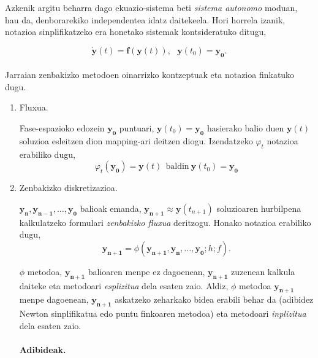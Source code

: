 Azkenik argitu beharra dago ekuazio-sistema beti \emph{sistema autonomo} moduan, hau da, denborarekiko independentea idatz daitekeela. Hori horrela izanik, notazioa sinplifikatzeko era honetako sistemak kontsideratuko ditugu,   

\begin{equation}
\dot{\mathbf{y}}(t)=\mathbf{f}(\mathbf{y}(t)),\ \ \ \mathbf{y}(t_0)=\mathbf{y_0}.
\end{equation}


\paragraph*{}Jarraian zenbakizko metodoen oinarrizko kontzeptuak eta notazioa finkatuko dugu.

\begin{enumerate}

\item Fluxua.

Fase-espazioko edozein $\mathbf{y_0}$ puntuari, $\mathbf{y}(t_0)=\mathbf{y_0}$ hasierako balio duen $\mathbf{y}(t)$ soluzioa esleitzen dion mapping-ari deitzen diogu. Izendatzeko $\varphi_t$ notazioa erabiliko dugu,
\begin{equation*}
\varphi_t(\mathbf{y_0})=\mathbf{y}(t) \ \ \text{baldin} \  \mathbf{y}(t_0)=\mathbf{y_0}
\end{equation*}

\item Zenbakizko diskretizazioa.

$\mathbf{y_{n}},\mathbf{y_{n-1}},\dots ,\mathbf{y_0}$ balioak emanda, $\mathbf{y_{n+1}}\approx \mathbf{y}(t_{n+1})$ soluzioaren hurbilpena kalkulatzeko formulari \emph{zenbakizko fluxua} deritzogu. Honako notazioa erabiliko dugu,
\begin{equation*}
\mathbf{y_{n+1}}=\phi(\mathbf{y_{n+1}},\mathbf{y_{n}},\dots,\mathbf{y_0};h;f).
\end{equation*}

$\phi$ metodoa, $\mathbf{y_{n+1}}$ balioaren menpe ez dagoenean, $\mathbf{y_{n+1}}$ zuzenean kalkula daiteke eta metodoari \emph{esplizitua} dela esaten zaio. Aldiz, $\phi$ metodoa $\mathbf{y_{n+1}}$ menpe dagoenean, $\mathbf{y_{n+1}}$ askatzeko zeharkako bidea erabili behar da (adibidez Newton sinplifikatua edo puntu finkoaren metodoa) eta metodoari \emph{inplizitua} dela esaten zaio.  

\paragraph*{\textbf{Adibideak.}}


\end{enumerate}
